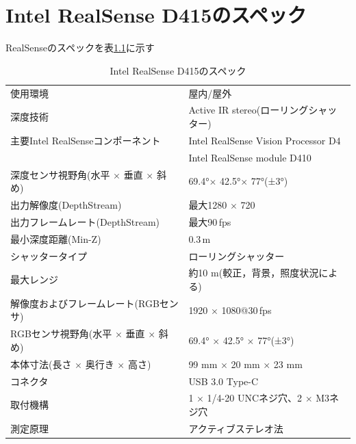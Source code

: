 \documentclass[a4j, fleqn, 12pt]{jsreport}
\begin{document}
\chapter{Intel RealSense D415のスペック}\label{D415}
RealSenseのスペックを表\ref{rss}に示す
\begin{table}[h]
  \centering
  \caption{Intel RealSense D415のスペック}
  \begin{tabular}{l|l}
    \hline
    {\small 使用環境}                                  & {\small 屋内/屋外}                                     \\
    {\small 深度技術}                                  & {\small Active IR stereo(ローリングシャッター)}              \\
    {\small 主要Intel RealSenseコンポーネント}              & {\small Intel RealSense Vision Processor D4}       \\
                                                   & {\small Intel RealSense module D410}               \\
    {\small 深度センサ視野角(水平 $\times$ 垂直 $\times$ 斜め)}  & {\small 69.4°$\times$ 42.5°$\times$ 77°(±3°)}      \\
    {\small 出力解像度(DepthStream)}                    & {\small 最大1280 $\times$ 720}                       \\
    {\small 出力フレームレート(DepthStream) }               & {\small 最大90\,fps}                                 \\
    {\small 最小深度距離(Min-Z)}                         & {\small 0.3\,m}                                    \\
    {\small シャッタータイプ}                              & {\small ローリングシャッター}                                \\
    {\small 最大レンジ}                                 & {\small 約10 m(較正，背景，照度状況による)}                      \\
    {\small 解像度およびフレームレート(RGBセンサ)}                 & {\small 1920 $\times$ 1080@30\,fps }               \\
    {\small RGBセンサ視野角(水平 $\times$ 垂直 $\times$ 斜め)} & {\small 69.4° $\times$ 42.5° $\times$ 77°(±3°)}    \\
    {\small 本体寸法(長さ $\times$ 奥行き $\times$ 高さ)}     & {\small 99 mm $\times$ 20 mm $\times$ 23 mm}       \\
    {\small コネクタ}                                  & {\small USB 3.0 Type-C}                            \\
    {\small 取付機構}                                  & {\small 1 $\times$ 1/4-20 UNCネジ穴、2 $\times$ M3ネジ穴} \\
    {\small 測定原理}                                  & {\small アクティブステレオ法}                                \\\hline
  \end{tabular}
  \label{rss}
\end{table}
\end{document}
